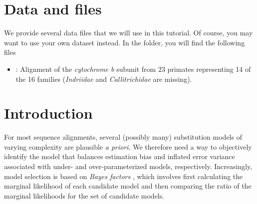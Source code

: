 \section{Data and files}

We provide several data files that we will use in this tutorial.
Of course, you may want to use your own dataset instead.
In the  folder, you will find the following files
\begin{itemize}
\item
{}: Alignment of the \textit{cytochrome b} subunit from 23 primates representing 14 of the 16 families (\textit{Indriidae} and \textit{Callitrichidae} are missing).
\end{itemize}



\section{Introduction}

For most sequence alignments, several (possibly many) substitution models of varying complexity are plausible \emph{a priori}.
We therefore need a way to objectively identify the model that balances estimation bias and inflated error variance associated with under- and over-parameterized models, respectively.
Increasingly, model selection is based on \emph{Bayes factors} \citep[\EG][]{Suchard2001,Lartillot2006,Xie2011,Baele2012,Baele2013}, which involves first calculating the marginal likelihood of each candidate model and then comparing the ratio of the marginal likelihoods for the set of candidate models.

